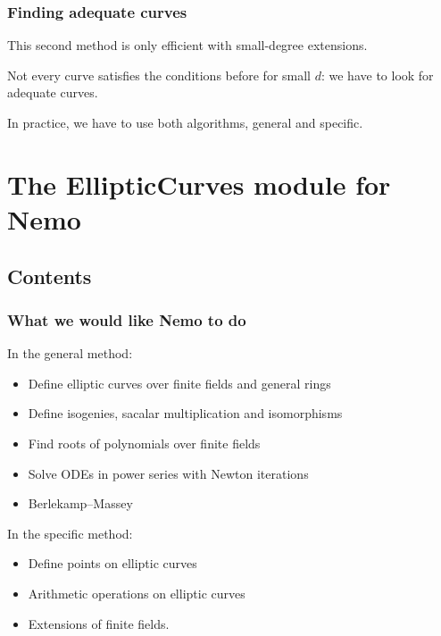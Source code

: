 \documentclass[12pt]{beamer}
\begin{document}
\begin{frame}
 \frametitle{Finding adequate curves}
 
 This second method is only efficient with small-degree extensions.
 
 Not every curve satisfies the conditions before for small $d$: we have to look for adequate curves.
 
 In practice, we have to use both algorithms, general and specific.

\end{frame}

\section{The EllipticCurves module for Nemo}


\subsection{Contents}

\begin{frame}
 \frametitle{What we would like Nemo to do}
 
 In the general method:
  \begin{itemize}
   \item Define elliptic curves over finite fields and general rings
   \item Define isogenies, sacalar multiplication and isomorphisms
   \item Find roots of polynomials over finite fields
   \item Solve ODEs in power series with Newton iterations
   \item Berlekamp--Massey
  \end{itemize}
   
  \pause
  
  In the specific method:
  \begin{itemize}
   \item Define points on elliptic curves
   \item Arithmetic operations on elliptic curves
   \item Extensions of finite fields.
  \end{itemize}

\end{frame}
\end{document}

